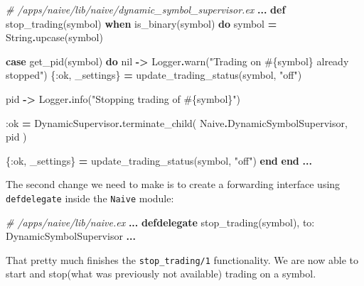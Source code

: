 \documentclass[
]{book}
\newenvironment{Shaded}{\begin{snugshade}}{\end{snugshade}}
\newcommand{\CommentTok}[1]{\textcolor[rgb]{0.56,0.35,0.01}{\textit{#1}}}
\newcommand{\ConstantTok}[1]{\textcolor[rgb]{0.00,0.00,0.00}{#1}}
\newcommand{\KeywordTok}[1]{\textcolor[rgb]{0.13,0.29,0.53}{\textbf{#1}}}
\newcommand{\NormalTok}[1]{#1}
\newcommand{\OperatorTok}[1]{\textcolor[rgb]{0.81,0.36,0.00}{\textbf{#1}}}
\newcommand{\OtherTok}[1]{\textcolor[rgb]{0.56,0.35,0.01}{#1}}
\newcommand{\StringTok}[1]{\textcolor[rgb]{0.31,0.60,0.02}{#1}}
\newcommand{\VariableTok}[1]{\textcolor[rgb]{0.00,0.00,0.00}{#1}}
\begin{document}
\begin{Shaded}
\begin{Highlighting}[]
\CommentTok{\# /apps/naive/lib/naive/dynamic\_symbol\_supervisor.ex}
  \OperatorTok{...}
  \KeywordTok{def}\NormalTok{ stop\_trading(symbol) }\KeywordTok{when}\NormalTok{ is\_binary(symbol) }\KeywordTok{do}
\NormalTok{    symbol }\OperatorTok{=} \ConstantTok{String}\OperatorTok{.}\NormalTok{upcase(symbol)}

    \KeywordTok{case}\NormalTok{ get\_pid(symbol) }\KeywordTok{do}
      \ConstantTok{nil} \OperatorTok{{-}\textgreater{}}
        \ConstantTok{Logger}\OperatorTok{.}\NormalTok{warn(}\StringTok{"Trading on }\OtherTok{\#\{}\NormalTok{symbol}\OtherTok{\}}\StringTok{ already stopped"}\NormalTok{)}
\NormalTok{        \{}\VariableTok{:ok}\NormalTok{, \_settings\} }\OperatorTok{=}\NormalTok{ update\_trading\_status(symbol, }\StringTok{"off"}\NormalTok{)}

\NormalTok{      pid }\OperatorTok{{-}\textgreater{}}
        \ConstantTok{Logger}\OperatorTok{.}\NormalTok{info(}\StringTok{"Stopping trading of }\OtherTok{\#\{}\NormalTok{symbol}\OtherTok{\}}\StringTok{"}\NormalTok{)}

        \VariableTok{:ok} \OperatorTok{=}
          \ConstantTok{DynamicSupervisor}\OperatorTok{.}\NormalTok{terminate\_child(}
            \ConstantTok{Naive}\OperatorTok{.}\ConstantTok{DynamicSymbolSupervisor}\NormalTok{,}
\NormalTok{            pid}
\NormalTok{          )}

\NormalTok{        \{}\VariableTok{:ok}\NormalTok{, \_settings\} }\OperatorTok{=}\NormalTok{ update\_trading\_status(symbol, }\StringTok{"off"}\NormalTok{)}
    \KeywordTok{end}
  \KeywordTok{end}
  \OperatorTok{...}
\end{Highlighting}
\end{Shaded}

The second change we need to make is to create a forwarding interface using \texttt{defdelegate} inside the \texttt{Naive} module:

\begin{Shaded}
\begin{Highlighting}[]
\CommentTok{\# /apps/naive/lib/naive.ex}
  \OperatorTok{...}
  \KeywordTok{defdelegate}\NormalTok{ stop\_trading(symbol), }\VariableTok{to:} \ConstantTok{DynamicSymbolSupervisor}
  \OperatorTok{...}
\end{Highlighting}
\end{Shaded}

That pretty much finishes the \texttt{stop\_trading/1} functionality. We are now able to start and stop(what was previously not available) trading on a symbol.
\end{document}
